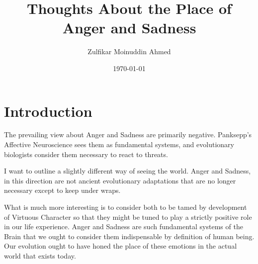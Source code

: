 \documentclass{amsart}
\title{Thoughts About the Place of Anger and Sadness}
\author{Zulfikar Moinuddin Ahmed}
\date{\today}
\begin{document}
\maketitle

\section{Introduction}

The prevailing view about Anger and Sadness are primarily negative.  Panksepp's Affective Neuroscience sees them as fundamental systems, and evolutionary biologists consider them necessary to react to threats.  

I want to outline a slightly different way of seeing the world.  Anger and Sadness, in this direction are not ancient evolutionary adaptations that are no longer necessary except to keep under wraps.

What is much more interesting is to consider both to be tamed by development of Virtuous Character so that they might be tuned to play a strictly positive role in our life experience.  Anger and Sadness are such fundamental systems of the Brain that we ought to consider them indispensable by definition of human being.  Our evolution ought to have honed the place of these emotions in the actual world that exists today.   
\end{document}
